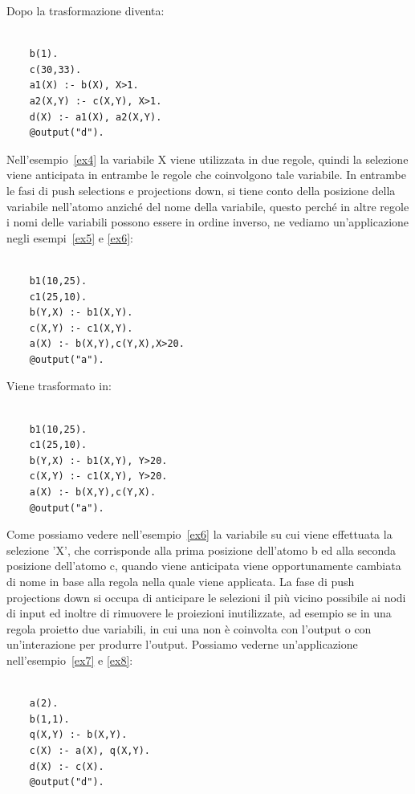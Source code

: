 Dopo la trasformazione diventa: 
\begin{example}\label{ex4}
	\begin{lstlisting}
	
	b(1). 
	c(30,33). 
	a1(X) :- b(X), X>1. 
	a2(X,Y) :- c(X,Y), X>1. 
	d(X) :- a1(X), a2(X,Y). 
	@output("d").
	\end{lstlisting}
\end{example}
Nell'esempio~\ref{ex4} la variabile X viene utilizzata in due regole, quindi la selezione viene anticipata in entrambe le regole che coinvolgono tale variabile. \newline
In entrambe le fasi di push selections e projections down, si tiene conto della posizione della variabile nell'atomo anziché del nome della variabile, questo perché in altre regole i nomi delle variabili possono essere in ordine inverso, ne vediamo un'applicazione negli esempi~\ref{ex5} e \ref{ex6}:
\begin{example}\label{ex5}
	\begin{lstlisting}
	
	b1(10,25). 
	c1(25,10). 
	b(Y,X) :- b1(X,Y). 
	c(X,Y) :- c1(X,Y). 
	a(X) :- b(X,Y),c(Y,X),X>20. 
	@output("a").
	\end{lstlisting}
\end{example}
Viene trasformato in:
\begin{example}\label{ex6}
	\begin{lstlisting}
	
	b1(10,25). 
	c1(25,10). 
	b(Y,X) :- b1(X,Y), Y>20. 
	c(X,Y) :- c1(X,Y), Y>20. 
	a(X) :- b(X,Y),c(Y,X). 
	@output("a").
	\end{lstlisting}
\end{example}
Come possiamo vedere nell'esempio~\ref{ex6} la variabile su cui viene effettuata la selezione 'X', che corrisponde alla prima posizione dell'atomo b ed alla seconda posizione dell'atomo c, quando viene anticipata viene opportunamente cambiata di nome in base alla regola nella quale viene applicata. \newline \newline
La fase di push projections down si occupa di anticipare le selezioni il più vicino possibile ai nodi di input ed inoltre di rimuovere le proiezioni inutilizzate, ad esempio se in una regola proietto due variabili, in cui una non è coinvolta con l'output o con un'interazione per produrre l'output. Possiamo vederne un'applicazione nell'esempio~\ref{ex7} e \ref{ex8}:
\begin{example}\label{ex7}
	\begin{lstlisting}
	
	a(2). 
	b(1,1). 
	q(X,Y) :- b(X,Y). 
	c(X) :- a(X), q(X,Y). 
	d(X) :- c(X). 
	@output("d").
	\end{lstlisting}
\end{example}

